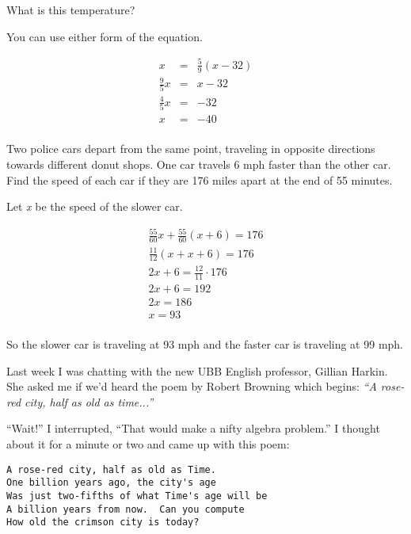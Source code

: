 \documentclass{exam}
\begin{document}
\begin{questions}
\begin{parts}
  What is this temperature?

\begin{solution}

You can use either form of the equation.

\begin{eqnarray*}
  x & = & \frac{5}{9} (x - 32) \\
  \frac{9}{5} x & = & x - 32 \\
  \frac{4}{5} x & = & -32 \\
  x & = & -40 \\
\end{eqnarray*}
\end{solution}

\end{parts}

\question

Two police cars depart from the same point, traveling in opposite directions towards different donut shops. One car
travels 6 mph faster than the other car.  Find the speed of each car if they are 176 miles apart at the end of 55
minutes.

\begin{solution}
Let {\em x} be the speed of the slower car.

\begin{eqnarray*}
  \frac{55}{60} x + \frac{55}{60}(x + 6) = 176 \\
  \frac{11}{12} (x + x + 6) = 176 \\
  2x + 6 = \frac{12}{11} \cdot 176 \\
  2x + 6 = 192 \\
  2x = 186 \\
  x = 93 \\
\end{eqnarray*}

So the slower car is traveling at 93 mph and the faster car is traveling at 99 mph.

\end{solution}

\question

Last week I was chatting with the new UBB English professor, Gillian Harkin.  She asked me if
we'd heard the poem by Robert Browning which begins: {\em ``A rose-red city, half as old as time...''}

``Wait!'' I interrupted,  ``That would make a nifty algebra problem.''  I thought about it for a minute or two and came up with
this poem:

\begin{verbatim}
A rose-red city, half as old as Time.
One billion years ago, the city's age
Was just two-fifths of what Time's age will be
A billion years from now.  Can you compute
How old the crimson city is today?
\end{verbatim}


\end{questions}
\end{document}
